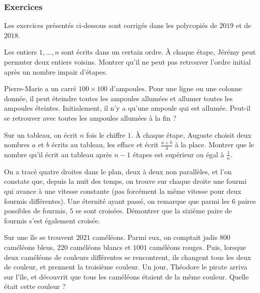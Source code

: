 \subsubsection{Exercices}


Les exercices présentés ci-dessous sont corrigés dans les polycopiés de $2019$ et de $2018$.

\begin{exo}
Les entiers $1, ..., n$ sont écrits dans un certain ordre. À chaque étape, Jérémy peut permuter deux entiers voisins. Montrer qu'il ne peut pas retrouver l'ordre initial après un nombre impair d'étapes.
\end{exo}


\begin{exo}
Pierre-Marie a un carré $100\times100$ d'ampoules. Pour une ligne ou une colonne donnée, il peut éteindre toutes les ampoules allumées et allumer toutes les ampoules éteintes. Initialement, il n'y a qu'une ampoule qui est allumée. Peut-il se retrouver avec toutes les ampoules allumées à la fin ?
\end{exo}


\begin{exo}
Sur un tableau, on écrit $n$ fois le chiffre $1$. À chaque étape, Auguste choisit deux nombres $a$ et $b$ écrits au tableau, les efface et écrit $\frac{a+b}4$ à la place. Montrer que le nombre qu'il écrit au tableau après $n - 1$ étapes est supérieur ou égal à $\frac1n$.
\end{exo}


\begin{exo}
On a tracé quatre droites dans le plan, deux à deux non parallèles, et l'on constate que, depuis la nuit des temps, on trouve sur chaque droite une fourmi qui avance à une vitesse constante (pas forcément la même vitesse pour deux fourmis différentes). Une éternité ayant passé, on remarque que parmi les $6$ paires possibles de fourmis, $5$ se sont croisées. Démontrer que la sixième paire de fourmis s'est également croisée.
\end{exo}


\begin{exo}
Sur une île se trouvent $2021$ caméléons. Parmi eux, on comptait jadis $800$ caméléons bleus, $220$ caméléons blancs et $1001$ caméléons rouges. Puis, lorsque deux caméléons de couleurs différentes se rencontrent, ils changent tous les deux de couleur, et prennent la troisième couleur. Un jour, Théodore le pirate arriva sur l'île, et découvrit que tous les caméléons étaient de la même couleur. Quelle était cette couleur ?
\end{exo}


